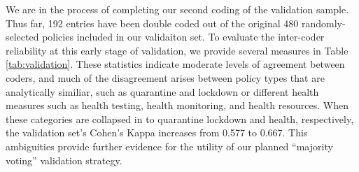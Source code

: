 \documentclass[]{article}
\begin{document}
We are in the process of completing our second coding of the validation sample. Thus far, 192 entries have been double coded out of the original 480 randomly-selected policies included in our validaiton set. To evaluate the inter-coder reliability at this early stage of validation, we provide several measures in Table \ref{tab:validation}. These statistics indicate moderate levels of agreement between coders, and much of the disagreement arises between policy types that are analytically similiar, such as quarantine and lockdown or different health measures such as health testing, health monitoring, and health resources. When these categories are collapsed in to quarantine lockdown and health, respectively, the validation set's Cohen's Kappa increases from 0.577 to 0.667. This ambiguities provide further evidence for the utility of our planned ``majority voting'' validation strategy.

\begin{table}[!h]
\centering
\caption{Inter-Coder Reliability Measures for On-Going Validation}
\label{tab:validation}
\end{table}
\end{document}
